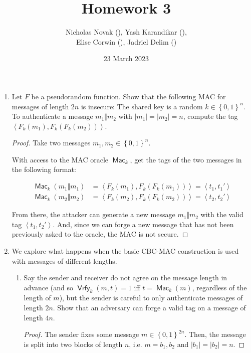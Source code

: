 \documentclass{article}
\title{Homework 3}
\date{23 March 2023}
\author{Nicholas Novak (), Yash Karandikar (),\\
Elise Corwin (), Jadriel Delim ()}
\DeclareMathOperator{\Mac}{\textsf{Mac}}
\DeclareMathOperator{\Vrfy}{\textsf{Vrfy}}
\begin{document}
\maketitle

\begin{enumerate}
  \item Let $F$ be a pseudorandom function. Show that the following MAC for
    messages of length $2n$ is insecure: The shared key is a random $k \in
    \left\{0, 1\right\}^n$. To authenticate a message $m_1 \Vert m_2$ with
    $|m_1| = |m_2| = n$, compute the tag $\left\langle F_k(m_1),
    F_k(F_k(m_2))\right\rangle$.

    \begin{proof}
      Take two messages $m_1, m_2 \in \left\{0, 1\right\}^n$.

      With access to the MAC oracle $\Mac_k$, get the tags of the two messages
      in the following format:

      \begin{align*}
        \Mac_k(m_1 \Vert m_1) &= \left\langle F_k(m_1),
        F_k(F_k(m_1))\right\rangle = \left\langle t_1, t_{1}'\right\rangle\\
        \Mac_k(m_2 \Vert m_2) &= \left\langle F_k(m_2),
        F_k(F_k(m_2))\right\rangle = \left\langle t_2, t_{2}'\right\rangle
      \end{align*}

      From there, the attacker can generate a new message $m_1 \Vert m_2$ with 
      the valid tag $\left\langle t_1, t_{2}'\right\rangle$. And, since we can
      forge a new message that has not been previously asked to the oracle, the 
      MAC is not secure.
    \end{proof}

  \item We explore what happens when the basic CBC-MAC construction is used with
    messages of different lengths.
    \begin{enumerate}
      \item Say the sender and receiver do not agree on the message length in
        advance (and so $\Vrfy_k(m, t) = 1$ iff $t = \Mac_k(m)$, regardless of
        the length of $m$), but the sender is careful to only authenticate
        messages of length $2n$. Show that an adversary can forge a valid tag on
        a message of length $4n$.

        \begin{proof}
          The sender fixes some message $m \in \left\{0, 1\right\}^{2n}$. Then,
          the message is split into two blocks of length $n$, i.e. $m = b_1, b_2$
          and $|b_1| = |b_2| = n$.


\end{proof}
\end{enumerate}
\end{enumerate}
\end{document}

